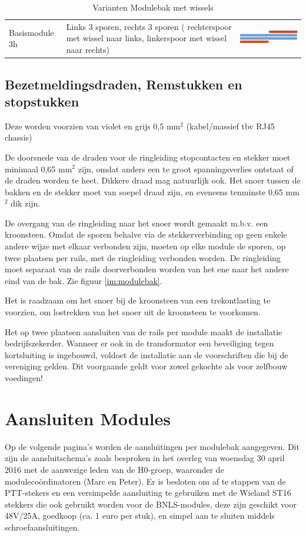 \documentclass[12pt,a4paper]{report}
\begin{document}
\begin{table}[!ht]
{\begin{tabular}{| l | m{7cm} | m{7cm} |}
\hline
Basismodule 3h&Links 3 sporen, rechts 3 sporen ( rechterspoor met wissel naar links, linkerspoor met wissel naar rechts)&\parbox[c]{1em} {\includegraphics[width=7cm]{images/module_3h}} \\
\hline
\end{tabular}
}
\caption{Varianten Modulebak met wissels}
\end{table}

\subsection{Bezetmeldingsdraden, Remstukken en stopstukken}
Deze worden voorzien van  violet en grijs  0,5 mm$^{2}$ (kabel/massief tbv RJ45 chassis)

De doorsnede van de draden voor de ringleiding stopcontacten en stekker moet minimaal 0,65 mm$^{2}$ zijn, omdat anders een te groot spanningsverlies ontstaat of de draden worden te heet. Dikkere draad mag natuurlijk ook.
Het snoer tussen de bakken en de stekker moet van soepel draad zijn, en eveneens tenminste 0,65 mm$^{2}$ dik zijn.

De overgang van de ringleiding naar het snoer wordt gemaakt m.b.v. een kroonsteen. Omdat de sporen behalve via de stekkerverbinding op geen enkele andere wijze met elkaar verbonden zijn, moeten op elke module de sporen, op twee plaatsen per rails, met de ringleiding verbonden worden. De ringleiding moet separaat van de rails doorverbonden worden van het ene naar het andere eind van de bak. Zie figuur \ref{im:modulebak}.

Het is raadzaam om het snoer bij de kroonsteen van een trekontlasting te voorzien, om lostrekken van het snoer uit de kroonsteen te voorkomen.

Het op twee plaatsen aansluiten van de rails per module maakt de installatie bedrijfszekerder. Wanneer er ook in de transformator een beveiliging tegen kortsluiting is ingebouwd, voldoet de installatie aan de voorschriften die bij de vereniging gelden. Dit voorgaande geldt voor zowel gekochte als voor zelfbouw voedingen!

\section{Aansluiten Modules}
Op de volgende pagina's worden de aansluitingen per modulebak aangegeven.
Dit zijn de aansluitschema's zoals besproken in het overleg van woensdag 30 april 2016 met de aanwezige leden van de H0-groep, waaronder de moduleco\"{o}rdinatoren (Marc en Peter).
Er is besloten om af te stappen van de PTT-stekers en een versimpelde aansluiting te gebruiken met de Wieland ST16 stekkers die ook gebruikt worden voor de BNLS-modules, deze zijn geschikt voor 48V/25A, goedkoop (ca. 1 euro per stuk), en simpel aan te sluiten middels schroefaansluitingen.
\end{document}
